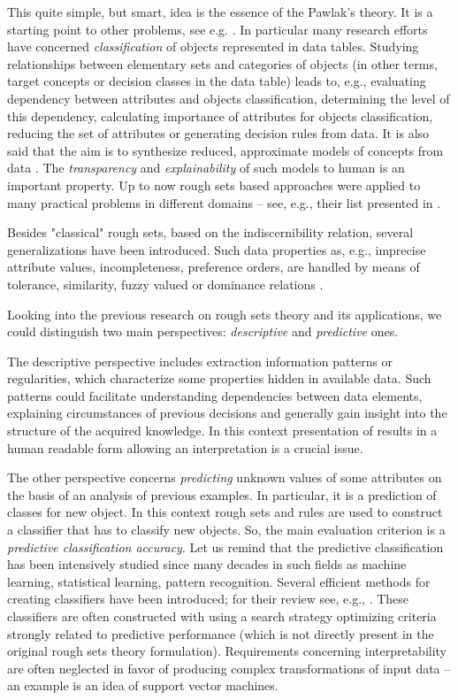 \documentclass{llncs}
\begin{document}
This quite simple, but smart, idea is the essence of the Pawlak's theory. It
is a starting point to other problems, see e.g.
\cite{acm,tutorial,pawlak91,GMS99}. In particular many research efforts have
concerned {\em classification} of objects represented in data tables.
Studying relationships between elementary sets
 and categories of objects (in other terms, target concepts or
  decision classes in the data table) leads to, e.g.,
 evaluating dependency between attributes and objects
classification, determining the level of this dependency,  calculating
importance of attributes for objects classification, reducing the set of
attributes or generating decision rules from data.  It is also said that the
aim is to synthesize reduced, approximate models of concepts from data
\cite{tutorial}. The {\em transparency} and {\em explainability} of such
models to human is an important property. Up to now rough sets based
approaches were applied to many practical problems in different domains --
see, e.g., their list presented in \cite{tutorial}.

Besides "classical" rough sets, based on the indiscernibility relation,
several generalizations have been introduced. Such data properties as, e.g.,
imprecise attribute values, incompleteness, preference orders, are handled
by means of tolerance, similarity, fuzzy valued or dominance relations
\cite{GMS99,tutorial,habcia}.

Looking into the previous research on rough sets theory and its
applications, we could distinguish two main perspectives: {\em descriptive}
and {\em predictive} ones.

The descriptive perspective includes extraction information patterns or
regularities, which characterize some properties hidden in available data.
Such patterns could facilitate understanding dependencies between data
elements, explaining circumstances of previous decisions and generally gain
insight into the structure of the acquired knowledge. In this context
presentation of results in a human readable form allowing an interpretation
is a crucial issue.

The other perspective concerns {\em predicting} unknown values of some
attributes on the basis of an analysis of  previous examples. In particular,
it is a prediction of classes for new object. In this context rough sets and
rules are used to construct a classifier that has to classify new objects.
So, the main evaluation criterion is  a {\em predictive classification
accuracy}. Let us remind that the predictive classification has been
intensively studied since many decades in such  fields as machine learning,
statistical learning, pattern recognition. Several efficient methods for
creating classifiers have been introduced;  for their review see, e.g.,
\cite{HanKamber,Zyt02,Mitchell}. These classifiers are often constructed
with using a search strategy optimizing criteria strongly related to
predictive performance (which is not directly present in the original rough
sets theory formulation). Requirements concerning interpretability are often
neglected in favor of producing complex transformations of input data -- an
example is an idea of support vector machines.
\end{document}
